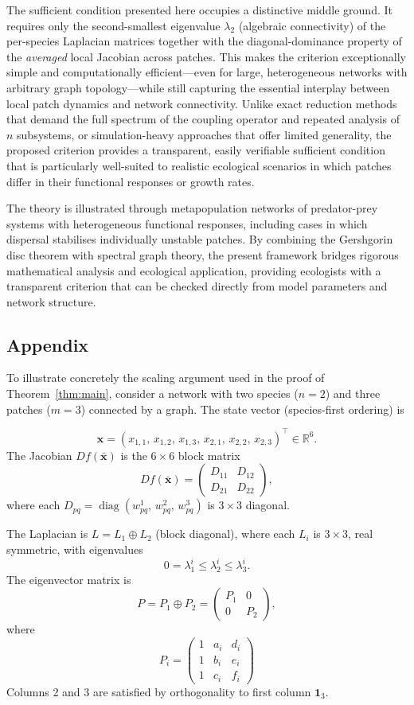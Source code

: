 \documentclass[12pt,a4paper]{article}
\theoremstyle{definition}
\begin{document}
The sufficient condition presented here occupies a distinctive middle ground. It requires only the second-smallest eigenvalue \(\lambda_2\) (algebraic connectivity) of the per-species Laplacian matrices together with the diagonal-dominance property of the \emph{averaged} local Jacobian across patches. This makes the criterion exceptionally simple and computationally efficient---even for large, heterogeneous networks with arbitrary graph topology---while still capturing the essential interplay between local patch dynamics and network connectivity. Unlike exact reduction methods that demand the full spectrum of the coupling operator and repeated analysis of \(n\) subsystems, or simulation-heavy approaches that offer limited generality, the proposed criterion provides a transparent, easily verifiable sufficient condition that is particularly well-suited to realistic ecological scenarios in which patches differ in their functional responses or growth rates.

The theory is illustrated through metapopulation networks of predator-prey systems with heterogeneous functional responses, including cases in which dispersal stabilises individually unstable patches.  By combining the Gershgorin disc theorem with spectral graph theory, the present framework bridges rigorous mathematical analysis and ecological application, providing ecologists with a transparent criterion that can be checked directly from model parameters and network structure.


\subsection*{Appendix}
To illustrate concretely the scaling argument used in the proof of Theorem~\ref{thm:main}, consider a network with two species ($  n=2  $) and three patches ($  m=3  $) connected by a graph. The state vector (species-first ordering) is

\[
\mathbf{x} = (x_{1,1},\, x_{1,2},\, x_{1,3},\, x_{2,1},\, x_{2,2},\, x_{2,3})^\top \in \mathbb{R}^6.
\]
The Jacobian \(Df(\bar{\mathbf{x}})\) is the \(6\times 6\) block matrix
\[
Df(\bar{\mathbf{x}}) = \begin{pmatrix}
D_{11} & D_{12} \\
D_{21} & D_{22}
\end{pmatrix},
\]
where each \(D_{pq} = \operatorname{diag}(w^1_{pq},\, w^2_{pq},\, w^3_{pq})\) is \(3\times 3\) diagonal.

The Laplacian is \(L = L_1 \oplus L_2\) (block diagonal), where each \(L_i\) is \(3\times 3\), real symmetric, with eigenvalues
\[
0 = \lambda^i_1 \leq \lambda^i_2 \leq \lambda^i_3.
\]
The eigenvector matrix is
\[
P = P_1 \oplus P_2 = \begin{pmatrix}
P_1 & 0 \\
0 & P_2
\end{pmatrix},
\]
where
\[
P_i = \begin{pmatrix}
1 & a_i & d_i \\
1 & b_i & e_i \\
1 & c_i & f_i
\end{pmatrix}
\]
Columns 2 and 3 are satisfied by orthogonality to first column \(\mathbf{1}_3\).
\end{document}
